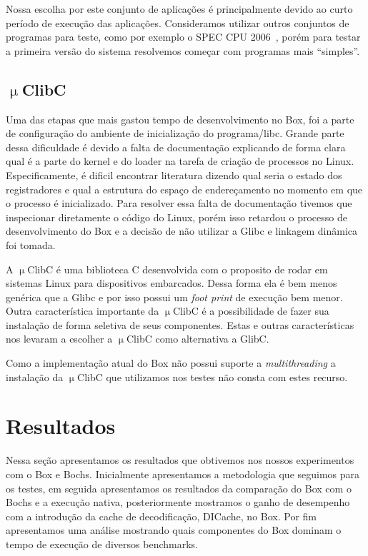\documentclass[11pt,twoside]{article}
\begin{document}
Nossa escolha por este conjunto de aplicações é principalmente devido ao curto
período de execução das aplicações. Consideramos utilizar outros conjuntos de
programas para teste, como por exemplo o SPEC CPU 2006~\cite{spec2006}, porém
para testar a primeira versão do sistema resolvemos começar com programas mais
``simples''.

\subsection{$\upmu$ClibC}

Uma das etapas que mais gastou tempo de desenvolvimento no Box, foi a parte de
configuração do ambiente de inicialização do programa/libc.  Grande parte dessa
dificuldade é devido a falta de documentação explicando de forma clara qual é a
parte do kernel e do loader na tarefa de criação de processos no
Linux. Especificamente, é dificil encontrar literatura dizendo qual seria o
estado dos registradores e qual a estrutura do espaço de endereçamento no
momento em que o processo é inicializado. Para resolver essa falta de
documentação tivemos que inspecionar diretamente o código do Linux, porém isso
retardou o processo de desenvolvimento do Box e a decisão de não utilizar a
Glibc e linkagem dinâmica foi tomada.

A $\upmu$ClibC é uma biblioteca C desenvolvida com o proposito de rodar em
sistemas Linux para dispositivos embarcados. Dessa forma ela é bem menos
genérica que a Glibc e por isso possui um \emph{foot print} de execução bem
menor. Outra característica importante da $\upmu$ClibC é a possibilidade de
fazer sua instalação de forma seletiva de seus componentes. Estas e outras
características nos levaram a escolher a $\upmu$ClibC como alternativa a GlibC.

Como a implementação atual do Box não possui suporte a \emph{multithreading} a
instalação da $\upmu$ClibC que utilizamos nos testes não consta com estes
recurso.


\section{Resultados} \label{sec:resultados}

Nessa seção apresentamos os resultados que obtivemos nos nossos experimentos
com o Box e Bochs. Inicialmente apresentamos a metodologia que seguimos para
os testes, em seguida apresentamos os resultados da comparação do Box com o
Bochs e a execução nativa, posteriormente mostramos o ganho de desempenho com
a introdução da cache de decodificação, DICache, no Box. Por fim apresentamos
uma análise mostrando quais componentes do Box dominam o tempo de execução de
diversos benchmarks.
\end{document}
